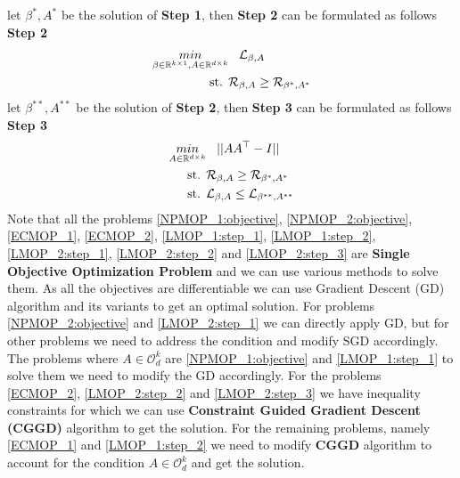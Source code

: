 let $\beta^{*}, A^{*}$ be the solution of \textbf{Step 1}, then \textbf{Step 2} can be formulated as follows
\newline \textbf{Step 2}
\begin{equation} \label{LMOP_2:step_2}
\begin{aligned}
    \underset{\beta\in \mathbb{R}^{k\times 1},A\in \mathbb{R}^{d\times k}}{min}& \hspace{3mm} \mathcal{L}_{\beta, A}\\
    \text{st.  }& \mathcal{R}_{\beta, A} \ge \mathcal{R}_{\beta^{*}, A^{*}}
\end{aligned}
\end{equation}
let $\beta^{**}, A^{**}$ be the solution of \textbf{Step 2}, then \textbf{Step 3} can be formulated as follows
\newline \textbf{Step 3}
\begin{equation} \label{LMOP_2:step_3}
\begin{aligned}
\underset{A\in \mathbb{R}^{d\times k}}{min}& \hspace{3mm} || AA^\top -I|| \\ 
\text{st.  }& \mathcal{R}_{\beta, A} \ge \mathcal{R}_{\beta^{*}, A^{*}}\\
\text{st.  }& \mathcal{L}_{\beta, A} \le \mathcal{L}_{\beta^{**}, A^{**}}\\
\end{aligned}
\end{equation}
\newline \newline Note that all the problems \ref{NPMOP_1:objective}, \ref{NPMOP_2:objective}, \ref{ECMOP_1}, \ref{ECMOP_2}, \ref{LMOP_1:step_1}, \ref{LMOP_1:step_2}, \ref{LMOP_2:step_1}, \ref{LMOP_2:step_2} and \ref{LMOP_2:step_3} are \textbf{Single Objective Optimization Problem} and we can use various methods to solve them. As all the objectives are differentiable we can use Gradient Descent (GD) algorithm and its variants to get an optimal solution. For problems \ref{NPMOP_2:objective} and \ref{LMOP_2:step_1} we can directly apply GD, but  for other problems we need to address the condition and modify SGD accordingly. The problems where $A \in \mathcal{O}_d^k$ are \ref{NPMOP_1:objective} and \ref{LMOP_1:step_1} to solve them we need to modify the GD accordingly. For the problems \ref{ECMOP_2}, \ref{LMOP_2:step_2} and \ref{LMOP_2:step_3} we have inequality constraints for which we can use \textbf{Constraint Guided Gradient Descent (CGGD)} algorithm \cite{karsmakers2022constraint} to get the solution. For the remaining problems, namely \ref{ECMOP_1} and \ref{LMOP_1:step_2} we need to modify \textbf{CGGD} algorithm to account for the condition $A \in \mathcal{O}_d^k$ and get the solution.
